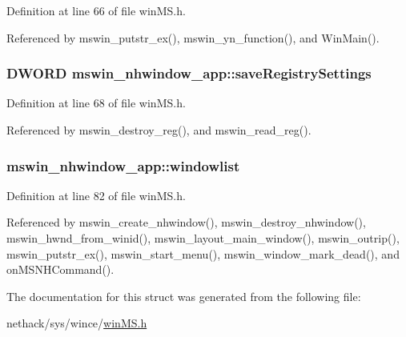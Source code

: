 Definition at line 66 of file win\+M\+S.\+h.



Referenced by mswin\+\_\+putstr\+\_\+ex(), mswin\+\_\+yn\+\_\+function(), and Win\+Main().

\hypertarget{structmswin__nhwindow__app_a3a571f4429ee942b1f03c5facfd21d20}{
\subsubsection[{save\+Registry\+Settings}]{\setlength{\rightskip}{0pt plus 5cm}D\+W\+O\+R\+D mswin\+\_\+nhwindow\+\_\+app\+::save\+Registry\+Settings}}\label{structmswin__nhwindow__app_a3a571f4429ee942b1f03c5facfd21d20}


Definition at line 68 of file win\+M\+S.\+h.



Referenced by mswin\+\_\+destroy\+\_\+reg(), and mswin\+\_\+read\+\_\+reg().

\hypertarget{structmswin__nhwindow__app_ae17570be9f8535fa8868079618f03e7e}{
\subsubsection[{windowlist}]{ mswin\+\_\+nhwindow\+\_\+app\+::windowlist}}\label{structmswin__nhwindow__app_ae17570be9f8535fa8868079618f03e7e}


Definition at line 82 of file win\+M\+S.\+h.



Referenced by mswin\+\_\+create\+\_\+nhwindow(), mswin\+\_\+destroy\+\_\+nhwindow(), mswin\+\_\+hwnd\+\_\+from\+\_\+winid(), mswin\+\_\+layout\+\_\+main\+\_\+window(), mswin\+\_\+outrip(), mswin\+\_\+putstr\+\_\+ex(), mswin\+\_\+start\+\_\+menu(), mswin\+\_\+window\+\_\+mark\+\_\+dead(), and on\+M\+S\+N\+H\+Command().



The documentation for this struct was generated from the following file\+:\begin{DoxyCompactItemize}
\item 
nethack/sys/wince/\hyperlink{sys_2wince_2winMS_8h}{win\+M\+S.\+h}\end{DoxyCompactItemize}
